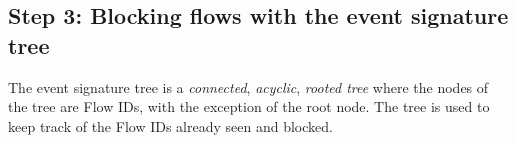 




\subsection{Step 3: Blocking flows with the event signature tree}
\label{sec:event-tree}

The event signature tree is a \emph{connected}, \emph{acyclic}, \emph{rooted tree} where the nodes of the tree are Flow IDs, with the exception of the root node. The tree is used to keep track of the Flow IDs already seen and blocked.


